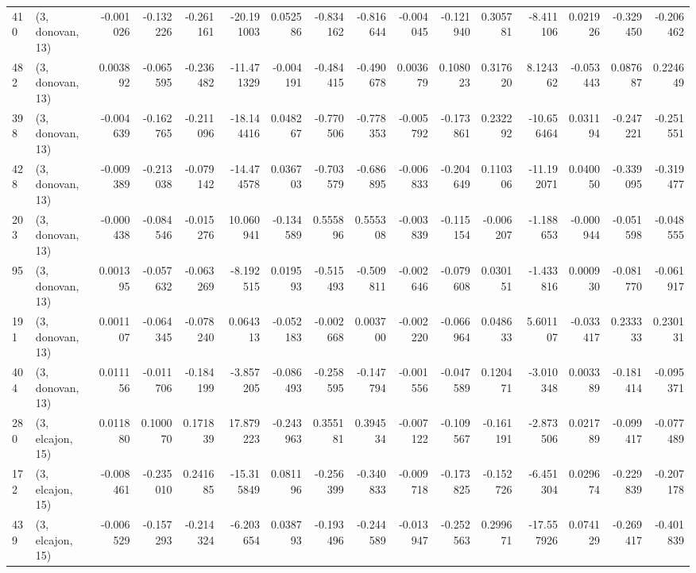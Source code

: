 \begin{tabular}{llrrrrrrrrrrrrrr}
410 &  (3, donovan, 13) &  -0.001026 & -0.132226 & -0.261161 &   -20.191003 &   0.052586 &  -0.834162 &  -0.816644 & -0.004045 & -0.121940 &  0.305781 &   -8.411106 &  0.021926 & -0.329450 & -0.206462 \\
482 &  (3, donovan, 13) &   0.003892 & -0.065595 & -0.236482 &   -11.471329 &  -0.004191 &  -0.484415 &  -0.490678 &  0.003679 &  0.108023 &  0.317620 &    8.124362 & -0.053443 &  0.087687 &  0.224649 \\
398 &  (3, donovan, 13) &  -0.004639 & -0.162765 & -0.211096 &   -18.144416 &   0.048267 &  -0.770506 &  -0.778353 & -0.005792 & -0.173861 &  0.232292 &  -10.656464 &  0.031194 & -0.247221 & -0.251551 \\
428 &  (3, donovan, 13) &  -0.009389 & -0.213038 & -0.079142 &   -14.474578 &   0.036703 &  -0.703579 &  -0.686895 & -0.006833 & -0.204649 &  0.110306 &  -11.192071 &  0.040050 & -0.339095 & -0.319477 \\
203 &  (3, donovan, 13) &  -0.000438 & -0.084546 & -0.015276 &    10.060941 &  -0.134589 &   0.555896 &   0.555308 & -0.003839 & -0.115154 & -0.006207 &   -1.188653 & -0.000944 & -0.051598 & -0.048555 \\
95  &  (3, donovan, 13) &   0.001395 & -0.057632 & -0.063269 &    -8.192515 &   0.019593 &  -0.515493 &  -0.509811 & -0.002646 & -0.079608 &  0.030151 &   -1.433816 &  0.000930 & -0.081770 & -0.061917 \\
191 &  (3, donovan, 13) &   0.001107 & -0.064345 & -0.078240 &     0.064313 &  -0.052183 &  -0.002668 &   0.003700 & -0.002220 & -0.066964 &  0.048633 &    5.601107 & -0.033417 &  0.233333 &  0.230131 \\
404 &  (3, donovan, 13) &   0.011156 & -0.011706 & -0.184199 &    -3.857205 &  -0.086493 &  -0.258595 &  -0.147794 & -0.001556 & -0.047589 &  0.120471 &   -3.010348 &  0.003389 & -0.181414 & -0.095371 \\
280 &  (3, elcajon, 15) &   0.011880 &  0.100070 &  0.171839 &    17.879223 &  -0.243963 &   0.355181 &   0.394534 & -0.007122 & -0.109567 & -0.161191 &   -2.873506 &  0.021789 & -0.099417 & -0.077489 \\
172 &  (3, elcajon, 15) &  -0.008461 & -0.235010 &  0.241685 &   -15.315849 &   0.081196 &  -0.256399 &  -0.340833 & -0.009718 & -0.173825 & -0.152726 &   -6.451304 &  0.029674 & -0.229839 & -0.207178 \\
439 &  (3, elcajon, 15) &  -0.006529 & -0.157293 & -0.214324 &    -6.203654 &   0.038793 &  -0.193496 &  -0.244589 & -0.013947 & -0.252563 &  0.299671 &  -17.557926 &  0.074129 & -0.269417 & -0.401839 \\

\end{tabular}
